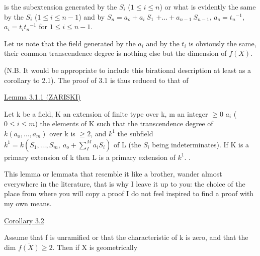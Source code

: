 
is the subextension generated by the $S_i$ ($1 \leq i \leq n$) or what is
evidently the same by the $S_i$ ($1 \leq i \leq n - 1$) and by $S_n = a_o + a_i\ S_1$
$+\ldots+a_{n-1}\ S_{n-1}$, $a_o = t_n{}^{-1}$, $a_i = t_it_n{}^{-1}$ for $1 \leq i \leq n - 1$.

Let us note that the field generated by the $a_i$ and by the $t_i$
is obviously the same, their common transcendence degree is
nothing else but the dimension of $f(X)$.

(N.B. It would be appropriate to include this birational
description at least as a corollary to 2.1).  The proof of 3.1 is
thus reduced to that of

\uline{Lemma 3.1.1 (ZARISKI)}

Let k be a field, K an extension of finite type over k, m an
integer $\geq 0$ $a_i$ ($0 \leq i \leq m$) the elements of K such that the
transcendence degree of $k(a_o,\ldots,a_m)$ over k is $\geq 2$, and $k^1$ the
subfield $k^1 = k(S_1,\ldots,S_m,\ a_o + \sum_{I}^{M} a_iS_i)$ of L (the $S_i$ being
indeterminates).  If K is a primary extension of k then L is a
primary extension of $k^1$.   .

This lemma or lemmata that resemble it like a brother, wander
almost everywhere in the literature, that is why I leave it up to
you:  the choice of the place from where you will copy a proof I
do not feel inspired to find a proof with my own means.

\uline{Corollary 3.2}

Assume that f is unramified or that the characteristic of k
is zero, and that the dim $\overline{f(X)} \geq 2$. Then if X is geometrically
